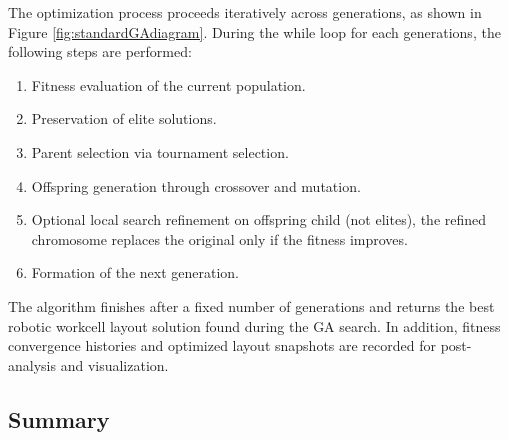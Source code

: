 \documentclass{article}
\begin{document}

    
    
    
    

The optimization process proceeds iteratively across generations, as shown in Figure \ref{fig:standardGAdiagram}. During the while loop for each generations, the following steps are performed:
\begin{enumerate}
    \item Fitness evaluation of the current population.
    \item Preservation of elite solutions.
    \item Parent selection via tournament selection.
    \item Offspring generation through crossover and mutation.
    \item Optional local search refinement on offspring child (not elites), the refined chromosome replaces the original only if the fitness improves.
    \item Formation of the next generation.
\end{enumerate}

The algorithm finishes after a fixed number of generations and returns the best robotic workcell layout solution found during the GA search. In addition, fitness convergence histories and optimized layout snapshots are recorded for post-analysis and visualization.

\subsection{Summary}
\end{document}
